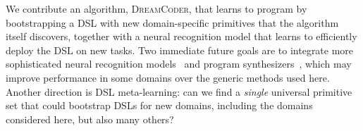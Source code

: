 \documentclass{article}
\newcommand{\systemEnding}{\textsc{DreamCoder}}
\begin{document}
We contribute an algorithm, \systemEnding, that learns to program by
bootstrapping a DSL with new domain-specific primitives that the algorithm
itself discovers, together with a neural recognition model that learns to
efficiently deploy the DSL on new tasks. %
Two immediate future goals are to integrate more sophisticated neural recognition
models~\cite{devlin2017robustfill} and program
synthesizers~\cite{solar2008program}, which may improve performance in some
domains over the generic methods used here.
Another direction is DSL meta-learning: can we find a
\emph{single} universal primitive set that could bootstrap DSLs for
new domains, including the domains considered here,  but also many others?



\end{document}
